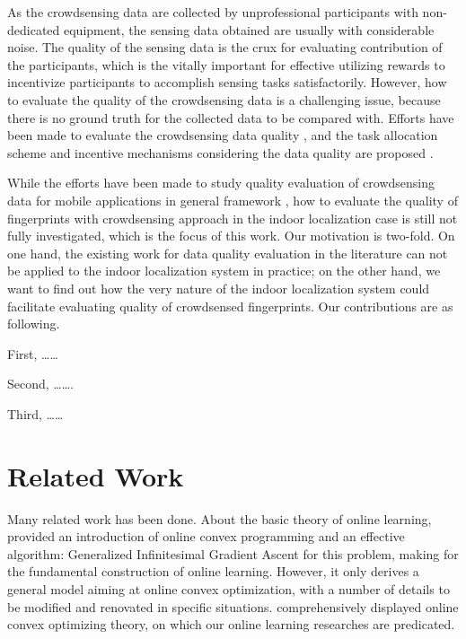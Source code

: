 \documentclass[10pt,conference,compsocconf,letterpaper]{IEEEtran}
\begin{document}
As the crowdsensing data are collected by unprofessional participants with non-dedicated equipment, the sensing data obtained are usually with considerable noise. The quality of the sensing data is the crux for evaluating contribution of the participants, which is the vitally important for effective utilizing rewards to incentivize participants to accomplish sensing tasks satisfactorily. However, how to evaluate the quality of the crowdsensing data is a challenging issue, because there is no ground truth for the collected data to be compared with. Efforts have been made to evaluate the crowdsensing data quality \cite{ Lbs2, Crowdloc14}, and the task allocation scheme \cite{ Taskselection15, recruit} and incentive mechanisms considering the data quality are proposed \cite{ Pengdan15, noise, incentive, Incentive2}. 

While the efforts have been made to study quality evaluation of crowdsensing data for mobile applications in general framework \cite{}, how to evaluate the quality of fingerprints with crowdsensing approach in the indoor localization case is still not fully investigated, which is the focus of this work. Our motivation is two-fold. On one hand, the existing work for data quality evaluation in the literature \cite{} can not be applied to the indoor localization system in practice; on the other hand, we want to find out how the very nature of the indoor localization system could facilitate evaluating quality of crowdsensed fingerprints. Our contributions are as following.

First, ……

Second, …….

Third, ……




\section{Related Work \label{sectionrelatedwork}}
Many related work has been done. About the basic theory of online learning, \cite{ICML-OLA} provided an introduction of online convex programming and an effective algorithm: Generalized Infinitesimal Gradient Ascent for this problem, making for the fundamental construction of online learning. However, it only derives a general model aiming at online convex optimization, with a number of details to be modified and renovated in specific situations. \cite{OLServey} comprehensively displayed online convex optimizing theory, on which our online learning researches are predicated.
\end{document}
